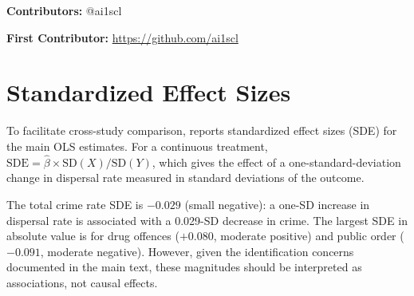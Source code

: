 \documentclass[12pt]{article}
\begin{document}
\noindent\textbf{Contributors:} @ai1scl

\noindent\textbf{First Contributor:} \url{https://github.com/ai1scl}

\label{apep_main_text_end}
\newpage


\newpage
\appendix

\section{Standardized Effect Sizes}
\label{sec:sde}

To facilitate cross-study comparison,  reports standardized effect sizes (SDE) for the main OLS estimates. For a continuous treatment, $\text{SDE} = \hat{\beta} \times \text{SD}(X) / \text{SD}(Y)$, which gives the effect of a one-standard-deviation change in dispersal rate measured in standard deviations of the outcome.

The total crime rate SDE is $-0.029$ (small negative): a one-SD increase in dispersal rate is associated with a 0.029-SD decrease in crime. The largest SDE in absolute value is for drug offences ($+0.080$, moderate positive) and public order ($-0.091$, moderate negative). However, given the identification concerns documented in the main text, these magnitudes should be interpreted as associations, not causal effects.


\end{document}
